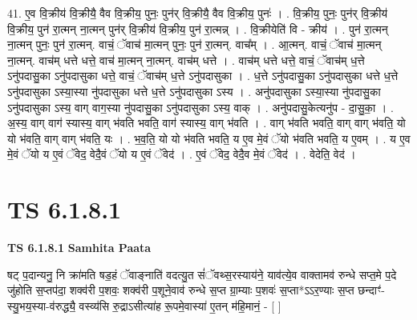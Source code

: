 \documentclass[17pt]{extarticle}
\begin{document}
41. ए॒व वि॒क्रीय॑ वि॒क्रीयै॒ वैव वि॒क्रीय॒ पुनः॒ पुन॑र् वि॒क्रीयै॒ वैव वि॒क्रीय॒ पुनः॑ । . वि॒क्रीय॒ पुनः॒ पुन॑र् वि॒क्रीय॑ वि॒क्रीय॒ पुन॑ रा॒त्मन् ना॒त्मन् पुन॑र् वि॒क्रीय॑ वि॒क्रीय॒ पुन॑ रा॒त्मन्न् । . वि॒क्रीयेति॑ वि - क्रीय॑ । . पुन॑ रा॒त्मन् ना॒त्मन् पुनः॒ पुन॑ रा॒त्मन्. वाचं॒ ॅवाच॑ मा॒त्मन् पुनः॒ पुन॑ रा॒त्मन्. वाच᳚म् । . आ॒त्मन्. वाचं॒ ॅवाच॑ मा॒त्मन् ना॒त्मन्. वाच॑म् धत्ते धत्ते॒ वाच॑ मा॒त्मन् ना॒त्मन्. वाच॑म् धत्ते । . वाच॑म् धत्ते धत्ते॒ वाचं॒ ॅवाच॑म् ध॒त्ते ऽनु॑पदासु॒का ऽनु॑पदासुका धत्ते॒ वाचं॒ ॅवाच॑म् ध॒त्ते ऽनु॑पदासुका । . ध॒त्ते ऽनु॑पदासु॒का ऽनु॑पदासुका धत्ते ध॒त्ते ऽनु॑पदासुका ऽस्या॒स्या नु॑पदासुका धत्ते ध॒त्ते ऽनु॑पदासुका ऽस्य । . अनु॑पदासुका ऽस्या॒स्या नु॑पदासु॒का ऽनु॑पदासुका ऽस्य॒ वाग् वाग॒स्या नु॑पदासु॒का ऽनु॑पदासुका ऽस्य॒ वाक् । . अनु॑पदासु॒केत्यनु॑प - दा॒सु॒का॒ । . अ॒स्य॒ वाग् वाग॑ स्यास्य॒ वाग् भ॑वति भवति॒ वाग॑ स्यास्य॒ वाग् भ॑वति । . वाग् भ॑वति भवति॒ वाग् वाग् भ॑वति॒ यो यो भ॑वति॒ वाग् वाग् भ॑वति॒ यः । . भ॒व॒ति॒ यो यो भ॑वति भवति॒ य ए॒व मे॒वं ॅयो भ॑वति भवति॒ य ए॒वम् । . य ए॒व मे॒वं ॅयो य ए॒वं ॅवेद॒ वेदै॒वं ॅयो य ए॒वं ॅवेद॑ । . ए॒वं ॅवेद॒ वेदै॒व मे॒वं ॅवेद॑ । . वेदेति॒ वेद॑ । \newline
\pagebreak
{}

\section{ TS 6.1.8.1 }

\textbf{TS 6.1.8.1 } \newline
\textbf{Samhita Paata} \newline

षट् प॒दान्यनु॒ नि क्रा॑मति षड॒हं ॅवाङ्नाति॑ वदत्यु॒त सं॑ॅवथ्स॒रस्याय॑ने॒ याव॑त्ये॒व वाक्तामव॑ रुन्धे सप्त॒मे प॒दे जु॑होति स॒प्तप॑दा॒ शक्व॑री प॒शवः॒ शक्व॑री प॒शूने॒वाव॑ रुन्धे स॒प्त ग्रा॒म्याः प॒शवः॑ स॒प्ता*ऽऽर॒ण्याः स॒प्त छन्दाꣳ॑-स्यु॒भय॒स्या-व॑रुद्ध्यै॒ वस्व्य॑सि रु॒द्राऽसीत्या॑ह रू॒पमे॒वास्या॑ ए॒तन् म॑हि॒मानं॒ - [  ] \newline
\end{document}
